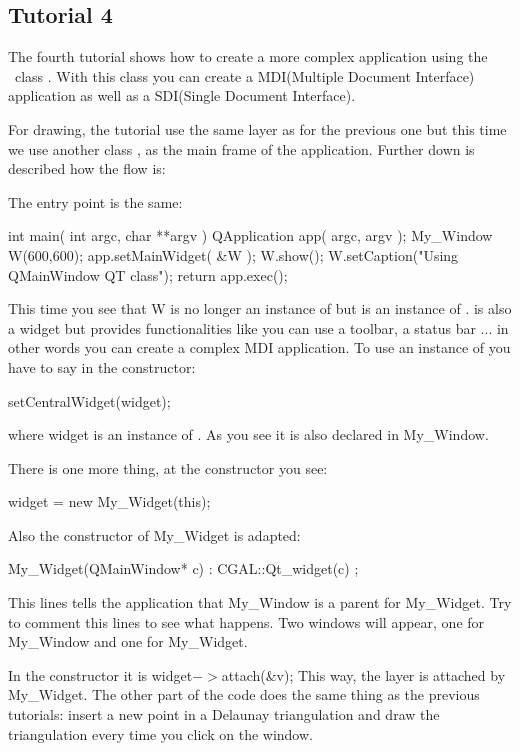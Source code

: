 \subsection*{Tutorial 4}

The fourth tutorial shows how to create a more complex application
using the \qt\ class . With this class you can create a
MDI(Multiple Document Interface) application as well as a SDI(Single Document Interface).

For drawing, the tutorial use the same layer as for the previous one
but this time we use another class , as the main frame of
the application. Further down is described how the flow is:

The entry point is the same:
\begin{ccExampleCode}
int main( int argc, char **argv )
{
    QApplication app( argc, argv );
    My_Window W(600,600);
    app.setMainWidget( &W );
    W.show();
    W.setCaption("Using QMainWindow QT class");
    return app.exec();
}
\end{ccExampleCode}
This time you see that W is no longer an instance of
 but is an instance of
.  is also a widget but
provides functionalities like you can use a toolbar, a status bar ... in other
words you can create a complex MDI application. To use an instance of
 you have to say in the constructor:
\begin{ccExampleCode}
setCentralWidget(widget);
\end{ccExampleCode}
where widget is an instance of . As you see it is
also declared in My\_Window.

There is one more thing, at the constructor you see:
\begin{ccExampleCode}
widget = new My_Widget(this);
\end{ccExampleCode}
Also the constructor of My\_Widget is adapted:
\begin{ccExampleCode}
My_Widget(QMainWindow* c) : CGAL::Qt_widget(c) {};
\end{ccExampleCode}
This lines tells the application that My\_Window is a parent for
My\_Widget. Try to comment this lines to see what happens. Two
windows will appear, one for My\_Window and one for My\_Widget.

In the constructor it is widget$->$attach(\&v); This way, the layer is
attached by My\_Widget. The other part of the code does the same thing as the
previous tutorials: insert a new point in a Delaunay triangulation and
draw the triangulation every time you click on the window.

